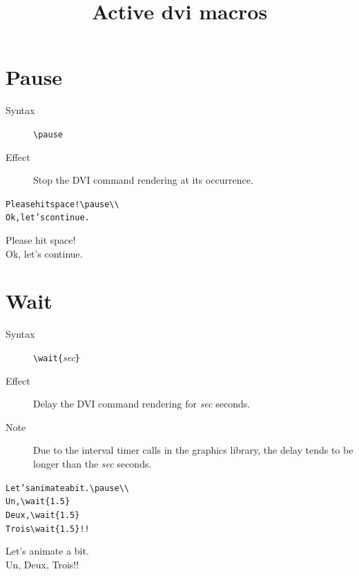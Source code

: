 \documentclass{article}
\title{Active dvi macros}
\begin{document}
\maketitle

\section{Pause}

\begin{description}
\item[Syntax]  \verb!\pause!
\item[Effect] Stop the DVI command rendering at its occurrence.
\end{description}

\begin{minipage}[t]{0.5\textwidth}
\begin{alltt}
Please hit space!{\color{blue}\verb!\!pause}\verb!\\!
Ok, let's continue.
\end{alltt}
\end{minipage}
\begin{minipage}[t]{0.5\textwidth}
Please hit space!\\ \pause Ok, let's continue.
\end{minipage}

\section{Wait}

\begin{description}
\item[Syntax]  \verb!\wait{!{\em{sec}}\verb!}!
\item[Effect] Delay the DVI command rendering for {\em{sec}} seconds.
\item[Note] Due to the interval timer calls in the graphics library,
  the delay tends to be longer than the {\em{sec}} seconds.
\end{description}

\begin{minipage}[t]{0.5\textwidth}
\begin{alltt}
Let's animate a bit.\verb!\pause\\!
Un,{\color{blue}\verb!\wait{1.5}!}
Deux,{\color{blue}\verb!\wait{1.5}!}
Trois{\color{blue}\verb!\wait{1.5}!}!! 
\end{alltt}
\end{minipage}
\begin{minipage}[t]{0.5\textwidth}
Let's animate a bit.\pause\\
Un,
Deux,
Trois!! 
\end{minipage}
\end{document}
